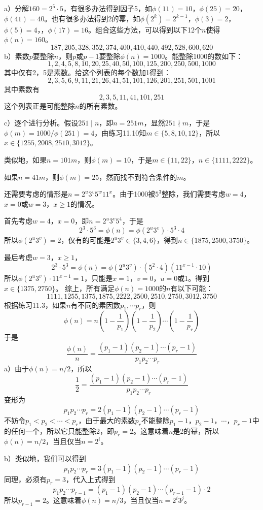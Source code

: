 %
\exercise a）分解$160=2^5\cdot5$，有很多办法得到因子5，如$\phi(11)=10$，$\phi(25)=20$，$\phi(41)=40$。也有很多办法得到2的幂，如$\phi(2^k)=2^{k-1}$，$\phi(3)=2$，$\phi(5)=4$，，$\phi(17)=16$。组合这些方法，可以得到以下12个$n$使得$\phi(n)=160$。
\[187,205,328,352,374,400,410,440,492,528,600,620\]
b）素数$p$要整除$n$，则$p$或$p-1$要整除$\phi(n)=1000$。能整除1000的数如下：
\[1,2,4,5,8,10,20,25,40,50,100,125,200,250,500,1000\]
其中仅有2，5是素数。给这个列表的每个数加1得到：
\[2,3,5,6,9,11,21,26,41,51,101,126,201,251,501,1001\]
其中素数有
\[2,3,5,11,41,101,251\]
这个列表正是可能整除$n$的所有素数。\par
c）逐个进行分析。假设$251\mid n$，即$n=251m$，显然$251\nmid m$，于是$\phi(m)=1000/\phi(251)=4$，由练习11.10知$m\in\{5,8,10,12\}$，所以$x\in \{1255,2008,2510,3012\}$。\par
类似地，如果$n=101m$，则$\phi(m)=10$，于是$m\in \{11,22\}$，$n\in\{1111,2222\}$。\par
如果$n=41m$，则$\phi(m)=25$，然而找不到符合条件的$m$。\par
还需要考虑的情形是$n=2^u3^v5^w11^x$。由于1000被$5^3$整除，我们需要考虑$w=4$，$x=0$或$w=3$，$x\ge1$的情况。\par
首先考虑$w=4$，$x=0$，即$n=2^u3^v5^4$，于是
\[2^3\cdot5^3=\phi(n)=\phi(2^u3^v)\cdot5^3\cdot4\]
所以$\phi(2^u3^v)=2$，仅有的可能是$2^u3^v\in\{3,4,6\}$，得到$n\in\{1875,2500,3750\}$。\par
最后考虑$w=3$，$x\ge1$，
\[2^3\cdot5^3=\phi(n)=\phi(2^u3^v)\cdot(5^2\cdot4)(11^{x-1}\cdot10)\]
所以$\phi(2^u3^v)\cdot11^{x-1}=1$，只能是$x=1$，$v=0$，$u=0$或1。得到$x\in\{1375,2750\}$。
综上，所有满足$\phi(n)=1000$的$n$有以下可能：
\[1111,1255,1375,1875,2222,2500,2510,2750,3012,3750\]
%
\exercise 根据练习11.3，如果$n$有不同的素因数$p_1,\cdots p_r$，则
\[\phi(n)=n\left(1-\frac{1}{p_1}\right)\left(1-\frac{1}{p_2}\right)\cdots\left(1-\frac{1}{p_r}\right)\]
于是
\[\frac{\phi(n)}{n}=\frac{(p_1-1)(p_2-1)\cdots(p_r-1)}{p_1p_2\cdots p_r}\]
a）由于$\phi(n)=n/2$，所以
\[\frac{1}{2}=\frac{(p_1-1)(p_2-1)\cdots(p_r-1)}{p_1p_2\cdots p_r}\]
变形为
\[p_1p_2\cdots p_r=2(p_1-1)(p_2-1)\cdots(p_r-1)\]
不妨令$p_1<p_2<\cdots<p_r$，由于最大的素数$p_r$不能整除$p_1-1$，$p_2-1$，$\cdots$，$p_r-1$中的任何一个，所以它只能整除2，即$p_r=2$。这意味着$n$是2的幂，所以$\phi(n)=n/2$，当且仅当$n=2^i$。\par
b）类似地，我们可以得到
\[p_1p_2\cdots p_r=3(p_1-1)(p_2-1)\cdots(p_r-1)\]
同理，必须有$p_r=3$，代入上式得到
\[p_1p_2\cdots p_{r-1}=(p_1-1)(p_2-1)\cdots(p_{r-1}-1)\cdot 2\]
所以$p_{r-1}=2$。这意味着$\phi(n)=n/3$，当且仅当$n=2^i3^j$。\par
